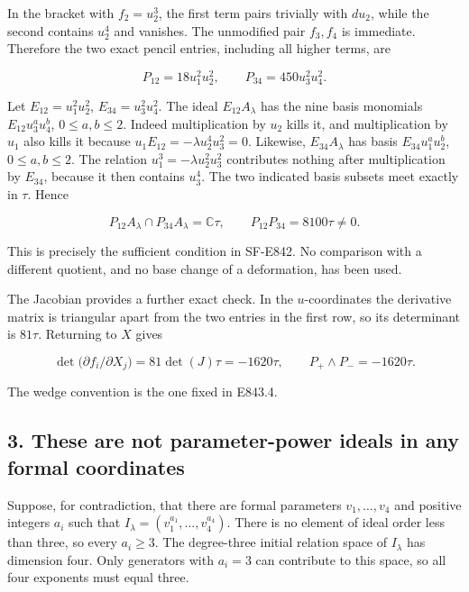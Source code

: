 In the bracket with \(f_2=u_2^3\), the first term pairs trivially with
\(du_2\), while the second contains \(u_2^4\) and vanishes.
The unmodified pair \(f_3,f_4\) is immediate. Therefore the two exact
pencil entries, including all higher terms, are

\[
             P_{12}=18u_1^2u_2^2,\qquad
             P_{34}=450u_3^2u_4^2.
 \tag{E844.7}
\]

Let \(E_{12}=u_1^2u_2^2\), \(E_{34}=u_3^2u_4^2\).
The ideal \(E_{12}A_\lambda\) has the nine basis monomials
\(E_{12}u_3^au_4^b\), \(0\le a,b\le2\).
Indeed multiplication by \(u_2\) kills it, and multiplication by \(u_1\)
also kills it because \(u_1E_{12}=-\lambda u_2^4u_3^2=0\).
Likewise, \(E_{34}A_\lambda\) has basis
\(E_{34}u_1^au_2^b\), \(0\le a,b\le2\).
The relation \(u_1^3=-\lambda u_2^2u_3^2\) contributes nothing after
multiplication by \(E_{34}\), because it then contains \(u_3^4\).
The two indicated basis subsets meet exactly in \(\tau\). Hence

\[
 P_{12}A_\lambda\cap P_{34}A_\lambda=\mathbb C\tau,\qquad
                        P_{12}P_{34}=8100\tau\ne0.
 \tag{E844.8}
\]

This is precisely the sufficient condition in SF-E842. No comparison with a
different quotient, and no base change of a deformation, has been used.

The Jacobian provides a further exact check. In the \(u\)-coordinates the
derivative matrix is triangular apart from the two entries in the first row,
so its determinant is \(81\tau\). Returning to \(X\) gives

\[
 \det\bigl(\partial f_i/\partial X_j\bigr)
       =81\det(J)\tau=-1620\tau,\qquad
                    P_+\wedge P_-=-1620\tau.
 \tag{E844.9}
\]

The wedge convention is the one fixed in E843.4.

\subsection{3. These are not parameter-power ideals in any formal coordinates}\label{SF-E844:these-are-not-parameter-power-ideals-in-any-formal-coordinates}

Suppose, for contradiction, that there are formal parameters \(v_1,\ldots,v_4\)
and positive integers \(a_i\) such that
\(I_\lambda=(v_1^{a_1},\ldots,v_4^{a_4})\).
There is no element of ideal order less than three, so every \(a_i\ge3\).
The degree-three initial relation space of \(I_\lambda\) has dimension four.
Only generators with \(a_i=3\) can contribute to this space, so all four
exponents must equal three.


